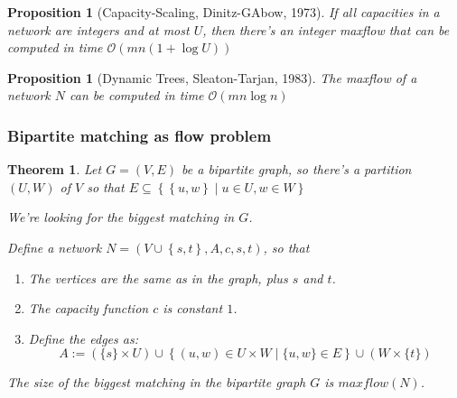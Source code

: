 \documentclass[12pt]{extarticle}
\theoremstyle{definition}
\theoremstyle{remark}
\theoremstyle{plain}
\newtheorem{theorem}[definition]{Theorem}
\theoremstyle{plain}
\newtheorem{proposition}[definition]{Proposition}
\theoremstyle{plain}
\newcommand{\BO}{\mathcal{O}}
\begin{document}
\begin{proposition}[Capacity-Scaling, Dinitz-GAbow, 1973]
    If all capacities in a network are integers and at most $U$, then
    there's an integer maxflow that can be computed in time $\BO(mn(1 + \log U))$
\end{proposition}

\begin{proposition}[Dynamic Trees, Sleaton-Tarjan, 1983]
    The maxflow of a network $N$ can be computed in time $\BO(mn \log n)$
\end{proposition}

\subsubsection{Bipartite matching as flow problem}

\begin{theorem}
    Let $G = (V, E)$ be a bipartite graph, so there's a partition $(U, W)$ of $V$ so that $E \subseteq \left\{ \left\{ u, w \right\} \mid u \in U, w \in W \right\}$

    We're looking for the biggest matching in $G$.

    Define a network $N = (V \cup \left\{ s, t \right\}, A, c, s, t)$, so that
    \begin{enumerate}
        \item The vertices are the same as in the graph, plus $s$ and $t$.
        \item The capacity function $c$ is constant $1$.
        \item Define the edges as:
              \[ A := (\{ s \} \times U) \cup \left\{ (u, w) \in U \times W \mid \{ u, w \} \in E \right\} \cup (W \times \{t\})\]
    \end{enumerate}

    The size of the biggest matching in the bipartite graph $G$ is $maxflow(N)$.
\end{theorem}
\end{document}
